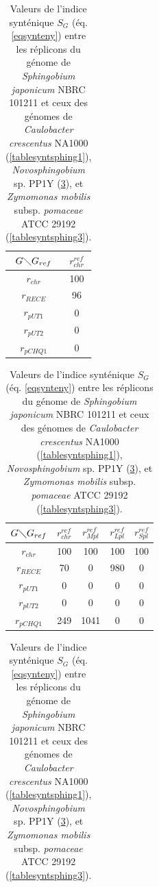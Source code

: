 \begin{table}[H]
\begin{center}
\caption[Valeurs de l'indice synténique pour \textit{Sphingobium}]{Valeurs de l'indice synténique $S_{G}$ (éq. \ref{eqsynteny}) entre les réplicons du génome de \textit{Sphingobium japonicum} NBRC 101211 et ceux des génomes de \textit{Caulobacter crescentus} NA1000 (\ref{tablesyntsphing1}), \textit{Novosphingobium} sp. PP1Y (\ref{tablesyntsphing2}), et \textit{Zymomonas mobilis} subsp. \textit{pomaceae} ATCC 29192 (\ref{tablesyntsphing3}).}\label{tablesyntsphing}
	\begin{minipage}[t]{0.45\textwidth}
	\label{tablesyntsphing1}
		\begin{tabular}{c|c}
		$G \diagdown G_{ref}$ & $r^{ref}_{chr} $\\
		\hline
		$r_{chr}$ & 100\\
		$ r_{RECE}$ & 96\\
		$r_{pUT1}$ & 0\\ 
		$r_{pUT2}$ & 0\\ 
		$r_{pCHQ1}$ & 0\\ 
		\end{tabular}
	\end{minipage}
\hspace{1cm}
	\begin{minipage}[t]{0.45\textwidth}
	\label{tablesyntsphing2}
		\begin{tabular}{c|cccc}
		$G \diagdown G_{ref}$ & $r^{ref}_{chr}$ & $r^{ref}_{Mpl}$ & $r^{ref}_{Lpl}$ & $r^{ref}_{Spl}$\\
		\hline
		$r_{chr}$ & 100 & 100 & 100 & 100\\
		$ r_{RECE}$ & 70 & 0 & 980 & 0\\
		$r_{pUT1}$ & 0 & 0 & 0 & 0\\ 
		$r_{pUT2}$ & 0 & 0 & 0 & 0\\ 
		$r_{pCHQ1}$ & 249 & 1041 & 0 & 0\\ 
		\end{tabular}
	\end{minipage}
\end{center}
\vspace*{0.5cm}
\centering
\hspace*{-1cm}
	\begin{minipage}[t]{0.45\textwidth}
		\begin{tabular}{c|ccc}

\end{tabular}
\end{minipage}
\end{table}
